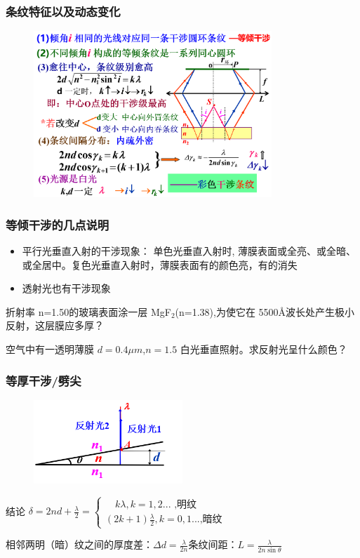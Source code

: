 \documentclass[UTF8]{ctexbeamer}
\begin{document}
\begin{frame}
	\frametitle{条纹特征以及动态变化}
	\begin{figure}[!ht]
		\centering
		\includegraphics[width=0.8\textwidth]{17}
	\end{figure}
\end{frame}
\begin{frame}
	\frametitle{等倾干涉的几点说明}
\begin{itemize}
	\item 平行光垂直入射的干涉现象： 单色光垂直入射时, 薄膜表面或全亮、或全暗、或全居中。复色光垂直入射时，薄膜表面有的颜色亮，有的消失
	\item 透射光也有干涉现象
\end{itemize}
\begin{examples}
	折射率 n=1.50的玻璃表面涂一层 MgF$_2$(n=1.38),为使它在 5500Å波长处产生极小反射，这层膜应多厚？
\end{examples}
\begin{examples}
	空气中有一透明薄膜 $d=0.4\mu m$,$n=1.5$ 白光垂直照射。求反射光呈什么颜色？
\end{examples}
\end{frame}
\begin{frame}
	\frametitle{等厚干涉/劈尖}
	\begin{figure}[!ht]
		\centering
		\includegraphics[width=0.5\textwidth]{18}
	\end{figure}
	\begin{block}{结论}
		$\delta=2nd+\frac\lambda2=\begin{cases}\quad k\lambda,k=1,2...\text{ ,明纹}\\(2k+1)\frac\lambda2, k=0,1...\text{,暗纹}&\end{cases}$
		
		相邻两明（暗）纹之间的厚度差：${\Delta d=\frac\lambda{2n}}$条纹间距：${L=\frac\lambda{2n\sin\theta}}$
	\end{block}
\end{frame}
\end{document}
